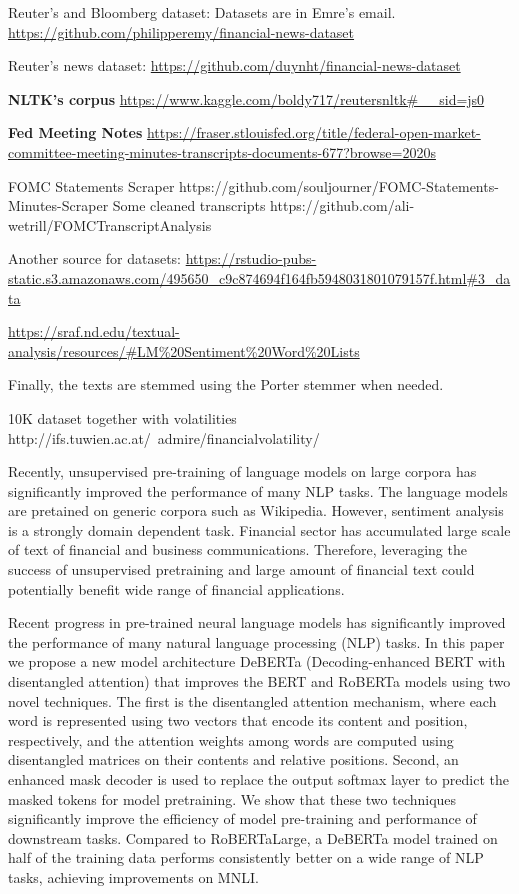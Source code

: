 \documentclass[11pt]{article}
\begin{document}
Reuter's and Bloomberg dataset: Datasets are in Emre's email.
\url{https://github.com/philipperemy/financial-news-dataset}

Reuter's news dataset:
\url{https://github.com/duynht/financial-news-dataset}

\textbf{NLTK's corpus}
\url{https://www.kaggle.com/boldy717/reutersnltk#__sid=js0}

\textbf{Fed Meeting Notes}
\url{https://fraser.stlouisfed.org/title/federal-open-market-committee-meeting-minutes-transcripts-documents-677?browse=2020s}

FOMC Statements Scraper
https://github.com/souljourner/FOMC-Statements-Minutes-Scraper
Some cleaned transcripts
https://github.com/ali-wetrill/FOMCTranscriptAnalysis

Another source for datasets: \url{https://rstudio-pubs-static.s3.amazonaws.com/495650_c9c874694f164fb5948031801079157f.html#3_data}

\url{https://sraf.nd.edu/textual-analysis/resources/#LM%20Sentiment%20Word%20Lists}

Finally, the texts are stemmed using the Porter stemmer when needed.

10K dataset together with volatilities
http://ifs.tuwien.ac.at/~admire/financialvolatility/


Recently, unsupervised pre-training of language models on large corpora has significantly improved the performance of many NLP tasks. The
language models are pretained on generic corpora such as Wikipedia. However, sentiment analysis
is a strongly domain dependent task. Financial sector has accumulated large scale of text of financial and business communications. Therefore,
leveraging the success of unsupervised pretraining and large amount of
financial text could potentially benefit wide range of financial applications.

Recent progress in pre-trained neural language models has significantly improved the performance of many natural language processing (NLP) tasks. In this paper we
propose a new model architecture DeBERTa (Decoding-enhanced BERT with disentangled attention) that improves the BERT and RoBERTa models using two novel
techniques. The first is the disentangled attention mechanism, where each word is represented using two vectors that encode its content and position, respectively,
and the attention weights among words are computed using disentangled
matrices on their contents and relative positions. Second, an enhanced mask decoder is used
to replace the output softmax layer to predict the masked tokens for model pretraining. We show that these two techniques significantly improve the efficiency of
model pre-training and performance of downstream tasks. Compared to RoBERTaLarge, a DeBERTa model trained on half of the training data performs consistently
better on a wide range of NLP tasks, achieving improvements on MNLI.
\end{document}
